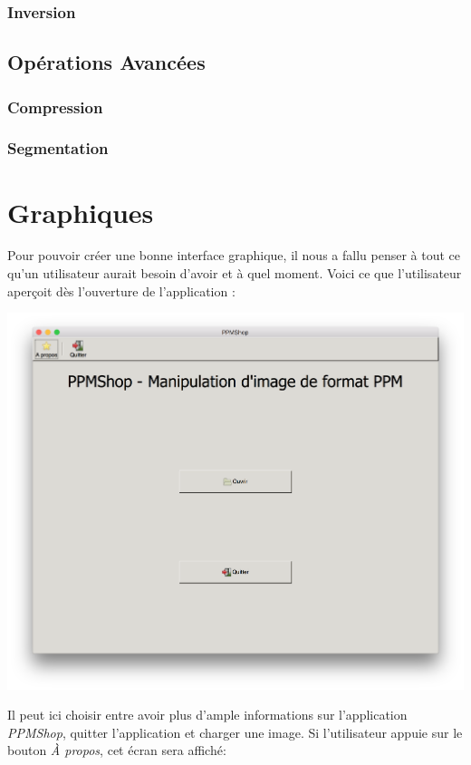 \documentclass[12pt]{article}
\begin{document}
\subsubsection{Inversion}
\subsection{Opérations Avancées}
\subsubsection{Compression}
\subsubsection{Segmentation}
\section{Graphiques}
Pour pouvoir créer une bonne interface graphique, il nous a fallu penser à tout ce qu'un utilisateur aurait besoin d'avoir et à quel moment. Voici ce que l'utilisateur aperçoit dès l'ouverture de l'application :\\

\begin{center}
\includegraphics[scale = 0.4]{firstScreen}\\
\end{center}

Il peut ici choisir entre avoir plus d'ample informations sur l'application \textit{PPMShop}, quitter l'application et charger une image.
Si l'utilisateur appuie sur le bouton \textit{À propos}, cet écran sera affiché: 
\end{document}
